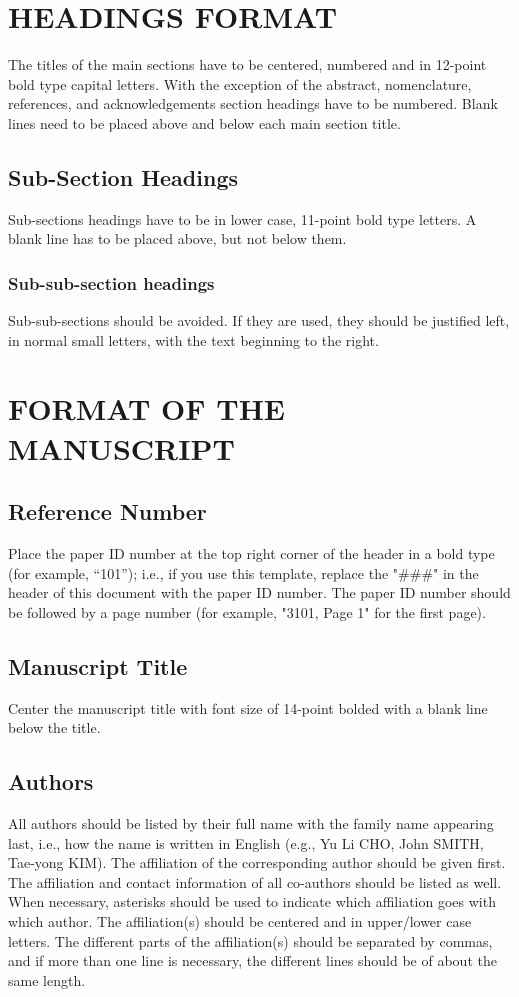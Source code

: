 \documentclass[10pt]{extarticle}
\begin{document}
\section{HEADINGS FORMAT}

The titles of the main sections have to be centered, numbered and in 12-point bold type capital letters.  With the exception of the abstract, nomenclature, references, and acknowledgements section headings have to be numbered. Blank lines need to be placed above and below each main section title.

\subsection{Sub-Section Headings}
Sub-sections headings have to be in lower case, 11-point bold type letters.  A blank line has to be placed above, but not below them.

\subsubsection{Sub-sub-section headings} Sub-sub-sections should be avoided. If they are used, they should be justified left, in normal small letters, with the text beginning to the right.

\section{FORMAT OF THE MANUSCRIPT}

\subsection{Reference Number}
Place the paper ID number at the top right corner of the header in a bold type (for example, “101”); i.e., if you use this template, replace the "\#\#\#" in the header of this document with the paper ID number. The paper ID number should be followed by a page number (for example, "3101, Page 1" for the first page). 

\subsection{Manuscript Title}
Center the manuscript title with font size of 14-point bolded with a blank line below the title.

\subsection{Authors}
All authors should be listed by their full name with the family name appearing last, i.e., how the name is written in English (e.g., Yu Li CHO, John SMITH, Tae-yong KIM). The affiliation of the corresponding author should be given first.  The affiliation and contact information of all co-authors should be listed as well.  When necessary, asterisks should be used to indicate which affiliation goes with which author.  The affiliation(s) should be centered and in upper/lower case letters.  The different parts of the affiliation(s) should be separated by commas, and if more than one line is necessary, the different lines should be of about the same length.
\end{document}
